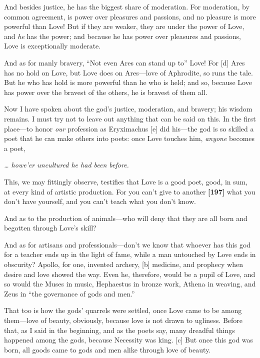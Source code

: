 And besides justice, he has the biggest share of
moderation. For
moderation, by common agreement, is power over pleasures and passions,
and no pleasure is more powerful than Love! But if they are weaker, they
are under the power of Love, and {\em he} has the power; and because he
has power over pleasures and passions, Love is exceptionally moderate.

And as for manly bravery, “Not even Ares can stand up to”
Love! For {[}d{]}
Ares has no hold on Love, but Love does on Ares---love of Aphrodite, so
runs the tale. But he
who has hold is more powerful than he who is held; and so, because Love
has power over the bravest of the others, he is bravest of them all.

Now I have spoken about the god's justice, moderation, and bravery; his
wisdom remains. I
must try not to leave out anything that can be said on this. In the
first place---to honor {\em our} profession as Eryximachus {[}e{]} did
his---the god is so
skilled a poet that he can make others into poets: once Love touches
him, {\em anyone} becomes a poet,\crlf
\crlf

{\em \ldots{} howe'er uncultured he had been
before.}\crlf
\crlf

This, we may fittingly observe, testifies that Love is a good poet,
good, in sum, at every kind of artistic production. For you can't give
to another {\bf {[}197{]}} what you don't have yourself, and you can't
teach what you don't know.

And as to the production of animals---who will deny that they are all
born and begotten through Love's skill?

And as for artisans and professionals---don't we know that whoever has
this god for a teacher ends up in the light of fame, while a man
untouched by Love ends in obscurity? Apollo, for one, invented archery,
{[}b{]} medicine, and prophecy when desire and love showed the way. Even
he, therefore, would be a pupil of Love, and so would the Muses in
music, Hephaestus in bronze work, Athena in weaving, and Zeus in “the
governance of gods and men.”

That too is how the gods' quarrels were settled, once Love came to be
among them---love of beauty, obviously, because love is not drawn to
ugliness. Before that, as I said in the beginning, and as the poets say,
many dreadful things happened among the gods, because Necessity was
king. {[}c{]} But once this god was born, all goods came to gods and men
alike through love of beauty.

